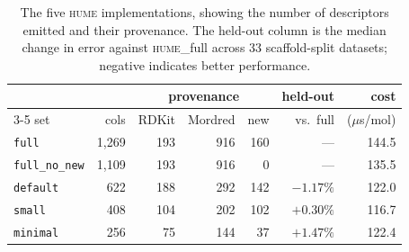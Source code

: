 \begin{table}[t]
\centering
\caption{The five \textsc{hume} implementations, showing the number of descriptors emitted and
their provenance. The held-out column is the median change in error against \textsc{hume}\_full
across 33 scaffold-split datasets; negative indicates better performance.}
\label{tab:column-sets}
\begin{tabular}{lrrrrrr}
\toprule
 & & \multicolumn{3}{c}{provenance} & held-out & cost \\
\cmidrule(lr){3-5}
set & cols & RDKit & Mordred & new & vs.\ full & ($\mu$s/mol) \\
\midrule
\texttt{full}          & 1{,}269 & 193 & 916 & 160 & ---       & 144.5 \\
\texttt{full\_no\_new} & 1{,}109 & 193 & 916 &   0 & ---       & 135.5 \\
\texttt{default}       &     622 & 188 & 292 & 142 & $-1.17\%$ & 122.0 \\
\texttt{small}         &     408 & 104 & 202 & 102 & $+0.30\%$ & 116.7 \\
\texttt{minimal}       &     256 &  75 & 144 &  37 & $+1.47\%$ & 122.4 \\
\bottomrule
\end{tabular}
\end{table}
